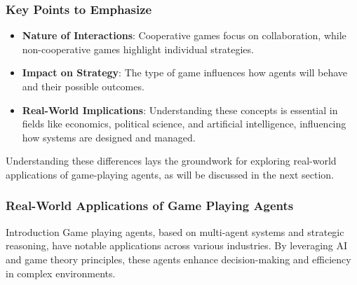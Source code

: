 \documentclass[aspectratio=169]{beamer}
\begin{document}
\begin{frame}[fragile]
    \frametitle{Key Points to Emphasize}
    \begin{itemize}
        \item \textbf{Nature of Interactions}: Cooperative games focus on collaboration, while non-cooperative games highlight individual strategies.
        \item \textbf{Impact on Strategy}: The type of game influences how agents will behave and their possible outcomes.
        \item \textbf{Real-World Implications}: Understanding these concepts is essential in fields like economics, political science, and artificial intelligence, influencing how systems are designed and managed.
    \end{itemize}
    
    Understanding these differences lays the groundwork for exploring real-world applications of game-playing agents, as will be discussed in the next section.
\end{frame}

\begin{frame}[fragile]
  \frametitle{Real-World Applications of Game Playing Agents}
  \begin{block}{Introduction}
    Game playing agents, based on multi-agent systems and strategic reasoning, have notable applications across various industries. By leveraging AI and game theory principles, these agents enhance decision-making and efficiency in complex environments.
  \end{block}
\end{frame}
\end{document}
